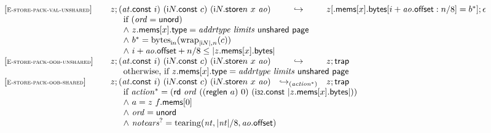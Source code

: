$$\begin{array}[t]{@{}lrcl@{}l@{}}
{[\textsc{\scriptsize E{-}store{-}pack{-}val{-}unshared}]} \quad & z ; ({\mathit{at}}{.}\mathsf{const}~i)~({\mathsf{i}}{N}{.}\mathsf{const}~c)~({{\mathsf{i}}{N}{.}\mathsf{store}}{n}~x~{\mathit{ao}}) & \hookrightarrow & z{}[{.}\mathsf{mems}{}[x]{.}\mathsf{bytes}{}[i + {\mathit{ao}}{.}\mathsf{offset} : n / 8] = {b^\ast}] ; \epsilon &  \\
& \multicolumn{4}{@{}l@{}}{\quad
\quad
\begin{array}[t]{@{}l@{}}
\mbox{if}~ ({\mathit{ord}} = \mathsf{unord}) \\
{\land}~ z{.}\mathsf{mems}{}[x]{.}\mathsf{type} = {\mathit{addrtype}}~{\mathit{limits}}~\mathsf{unshared}~\mathsf{page} \\
{\land}~ {b^\ast} = {{\mathrm{bytes}}}_{{\mathsf{i}}{n}}({{\mathrm{wrap}}}_{{|{\mathsf{i}}{N}|}, n}(c)) \\
{\land}~ i + {\mathit{ao}}{.}\mathsf{offset} + n / 8 \leq {|z{.}\mathsf{mems}{}[x]{.}\mathsf{bytes}|} \\
\end{array}
} \\
{[\textsc{\scriptsize E{-}store{-}pack{-}oob{-}unshared}]} \quad & z ; ({\mathit{at}}{.}\mathsf{const}~i)~({\mathsf{i}}{N}{.}\mathsf{const}~c)~({{\mathsf{i}}{N}{.}\mathsf{store}}{n}~x~{\mathit{ao}}) & \hookrightarrow & z ; \mathsf{trap} &  \\
& \multicolumn{4}{@{}l@{}}{\quad
\quad \mbox{otherwise, if}~ z{.}\mathsf{mems}{}[x]{.}\mathsf{type} = {\mathit{addrtype}}~{\mathit{limits}}~\mathsf{unshared}~\mathsf{page}
} \\
{[\textsc{\scriptsize E{-}store{-}pack{-}oob{-}shared}]} \quad & z ; ({\mathit{at}}{.}\mathsf{const}~i)~({\mathsf{i}}{N}{.}\mathsf{const}~c)~({{\mathsf{i}}{N}{.}\mathsf{store}}{n}~x~{\mathit{ao}}) & {\hookrightarrow}_{({{\mathit{action}}^\ast})} {} & z ; \mathsf{trap} &  \\
& \multicolumn{4}{@{}l@{}}{\quad
\quad
\begin{array}[t]{@{}l@{}}
\mbox{if}~ {{\mathit{action}}^\ast} = (\mathsf{rd}~{\mathit{ord}}~((\mathsf{reglen}~a)~0)~(\mathsf{i{\scriptstyle 32}}{.}\mathsf{const}~{|z{.}\mathsf{mems}{}[x]{.}\mathsf{bytes}|})) \\
{\land}~ a = z~f{.}\mathsf{mems}{}[0] \\
{\land}~ {\mathit{ord}} = \mathsf{unord} \\
{\land}~ {{\mathit{notears}}^?} = {\mathrm{tearing}}({\mathit{nt}}, {|{\mathit{nt}}|} / 8, {\mathit{ao}}{.}\mathsf{offset}) \\

\end{array}}
\end{array}$$
